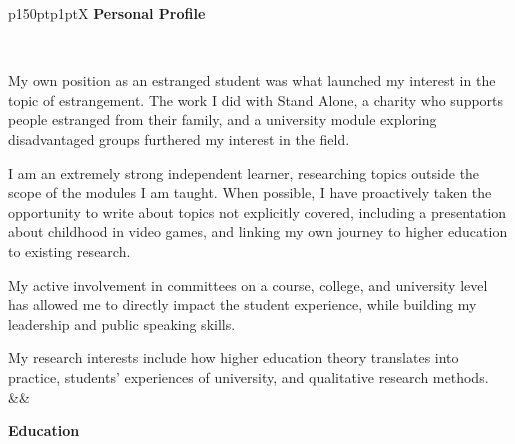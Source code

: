 \documentclass[hidelinks, 12pt, a4paper]{article}
\begin{document}
	\noindent
	\begin{table}[h!]
		\begin{tabularx}{\textwidth}{p{150pt}p{1pt}X}
			{\noindent\Large\textbf{Personal Profile}}
			
			\vspace{4pt}\
			 
			 My own position as an estranged student was what launched my interest in the topic of estrangement. The work I did with Stand Alone, a charity who supports people estranged from their family, and a university module exploring disadvantaged groups furthered my interest in the field.\newline
			 
			 I am an extremely strong independent learner, researching topics outside the scope of the modules I am taught. When possible, I have proactively taken the opportunity to write about topics not explicitly covered, including a presentation about childhood in video games, and linking my own journey to higher education to existing research.\newline
			 
			 My active involvement in committees on a course, college, and university level has allowed me to directly impact the student experience, while building my leadership and public speaking skills.\newline
			 
			 My research interests include how higher education theory translates into practice, students' experiences of university, and qualitative research methods.
			&&
			
			\begin{minipage}[t]{\linewidth}
				
				{\noindent\hspace{3pt}\Large\textbf{Education}}
				

\end{minipage}
\end{tabularx}
\end{table}
\end{document}
